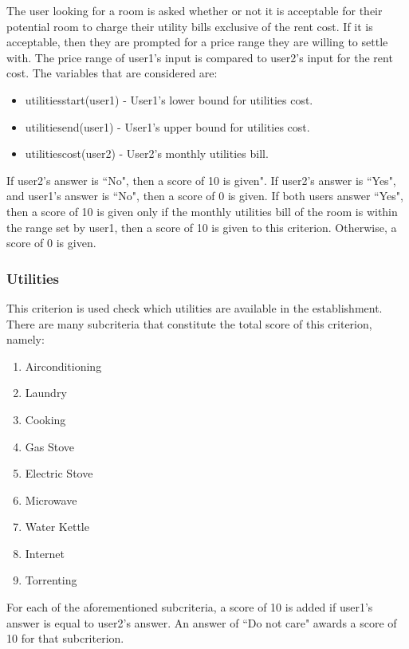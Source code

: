\documentclass[journal]{IEEEtran}
\begin{document}
        The user looking for a room is asked whether or not it is acceptable for their potential room to charge their
        utility bills exclusive of the rent cost. If it is acceptable, then they are prompted for a price range they are
        willing to settle with.  The price range of user1's input is compared to user2's input for the rent cost. The
        variables that are considered are:
        \begin{itemize}
            \item utilities\textunderscore start(user1) - User1's lower bound for utilities cost.
            \item utilities\textunderscore end(user1) -  User1's upper bound for utilities cost.
            \item utilities\textunderscore cost(user2) - User2's monthly utilities bill.
        \end{itemize}
        If user2's answer is ``No", then a score of 10 is given".
        If user2's answer is ``Yes", and user1's answer is ``No", then a score of 0 is given.
        If both users answer ``Yes", then a score of 10 is given only if the monthly utilities bill of the room is
        within the range set by user1, then a score of 10 is given to this criterion.
        Otherwise, a score of 0 is given.

    \subsubsection{Utilities}
        This criterion is used check which utilities are available in the establishment. There are many subcriteria that
        constitute the total score of this criterion, namely:
        \begin{enumerate}
            \item Airconditioning
            \item Laundry
            \item Cooking
            \item Gas Stove
            \item Electric Stove
            \item Microwave
            \item Water Kettle
            \item Internet
            \item Torrenting
        \end{enumerate}

        For each of the aforementioned subcriteria, a score of 10 is added if user1's answer is equal to user2's answer.
        An answer of ``Do not care" awards a score of 10 for that subcriterion.
\end{document}
